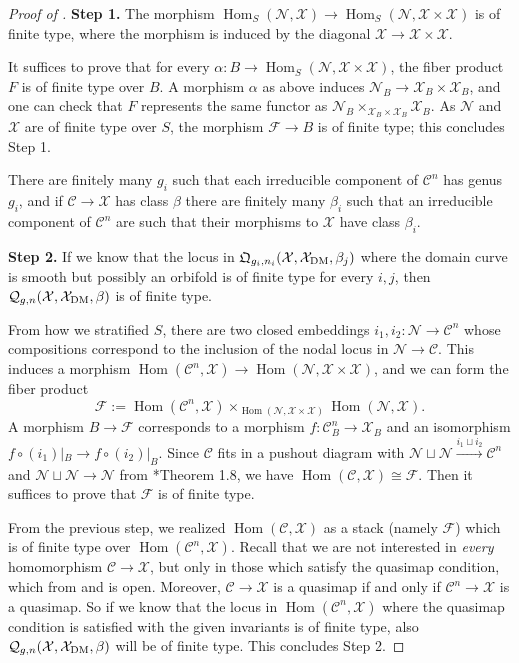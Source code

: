 \documentclass{amsart}
\newcommand{\sC}{\mathscr{C}}
\newcommand{\sF}{\mathscr{F}}
\newcommand{\sN}{\mathscr{N}}
\newcommand{\cQ}{\mathcal{Q}}
\newcommand{\cX}{\mathcal{X}}
\newcommand{\Hom}{\operatorname{Hom}}
\newcommand{\dm}{{\rm DM}}
\theoremstyle{definition}
\theoremstyle{definition}
\begin{document}
{\begin{proof}[Proof of ]
         \textbf{Step 1.} The morphism $\Hom_S(\sN,\cX)\to \Hom_S(\sN,\cX\times \cX)$ is of finite type, where the morphism is induced by the diagonal $\cX\to \cX\times \cX$.

         It suffices to prove that for every $\alpha\colon B\to \Hom_S(\sN,\cX\times \cX)$, the fiber product $F$ is of finite type over $B$. A morphism $\alpha$ as above induces $\sN_B\to \cX_B\times \cX_B$, and one can check that $F$ represents the same functor as $\sN_B\times_{\cX_B\times \cX_B}\cX_B$. As $\sN$ and $\cX$ are of finite type over $S$, the morphism $\sF\to B$ is of finite type; this concludes Step 1.

         There are finitely many $g_i$ such that each irreducible component of $\sC^n$ has genus $g_i$, and if $\sC\to \cX$ has class $\beta$ there are finitely many $\beta_i$ such that an irreducible component of $\sC^n$ are such that their morphisms to $\cX$ have class $\beta_i$. 

         \textbf{Step 2.} If we know that the locus in $\mathfrak{Q}_{g_i, n_i}(\cX,\cX_\dm,\beta_j)$ where the domain curve is smooth but possibly an orbifold is of finite type for every $i,j$, then $\cQ_{g,n}(\cX,\cX_\dm,\beta)$ is of finite type.

         
         From how we stratified $S$, there are two closed embeddings $i_1,i_2:\sN\to \sC^n$ whose compositions correspond to the inclusion of the nodal locus in $\sN\to\sC$. This induces a morphism $\Hom(\sC^n,\cX)\to \Hom(\sN,\cX\times \cX)$, and we can form the fiber product \[\sF:=\Hom(\sC^n,\cX)\times_{\Hom(\sN,\cX\times \cX)}\Hom(\sN,\cX).\]
         A morphism $B\to \sF$ corresponds to a morphism
         $f:\sC^n_B\to \cX_B$ and an isomorphism $f\circ (i_1)|_B\to f\circ (i_2)|_B$. Since $\sC$ fits in a pushout diagram with $\sN\sqcup\sN\xrightarrow{i_1\sqcup i_2}\sC^n$ and $\sN\sqcup\sN\to \sN$ from \cite{alper2024artin}*{Theorem 1.8}, we have $\Hom(\sC,\cX)\cong \sF$. Then it suffices to prove that $\sF$ is of finite type. 
         
         From the previous step, we realized $\Hom(\sC,\cX)$ as a stack (namely $\sF$) which is of finite type over $\Hom(\sC^n,\cX)$. Recall that we are not interested in \textit{every} homomorphism $\sC\to \cX$, but only in those which satisfy the quasimap condition, which from  and  is open. Moreover,  $\sC\to \cX$ is a quasimap if and only if $\sC^n\to \cX$ is a quasimap.
         So if we know that the locus in $\Hom(\sC^n,\cX)$ where the quasimap condition is satisfied with the given invariants is of finite type, also $\cQ_{g,n}(\cX,\cX_\dm,\beta)$ will be of finite type. This concludes Step 2.


\end{proof}}
\end{document}
